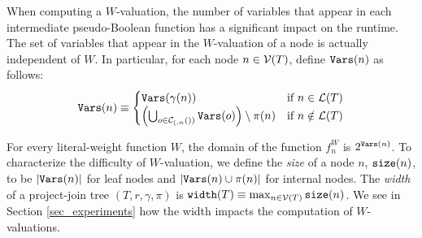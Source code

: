 When computing a $W$-valuation, the number of variables that appear in each intermediate pseudo-Boolean function has a significant impact on the runtime.
The set of variables that appear in the $W$-valuation of a node is actually independent of $W$.
In particular, for each node $n \in \mathcal{V}(T)$, define $\texttt{\upshape Vars}(n)$ as follows:
\begin{equation}
    \texttt{\upshape Vars}(n) \equiv
    \begin{cases}
        \texttt{\upshape Vars}(\gamma(n)) & \text{if}~n \in \mathcal{L}(T) \\
        \left( \bigcup_{o \in \mathcal{C}_{(,n}())} \texttt{\upshape Vars}(o) \right) \setminus \pi(n) & \text{if}~n \notin \mathcal{L}(T)
    \end{cases}
\end{equation}

For every literal-weight function $W$, the domain of the function $f^W_n$ is $2^{\texttt{\upshape Vars}(n)}$.
To characterize the difficulty of $W$-valuation, we define the \emph{size} of a node $n$, $\texttt{\upshape size}(n)$, to be $\left| \texttt{\upshape Vars}(n) \right|$ for leaf nodes and $\left| \texttt{\upshape Vars}(n) \cup \pi(n) \right|$ for internal nodes.
The \emph{width} of a project-join tree $(T, r, \gamma, \pi)$ is $\texttt{\upshape width}(T) \equiv \max_{n \in \mathcal{V}(T)} \texttt{\upshape size}(n)$.
We see in Section \ref{sec_experiments} how the width impacts the computation of $W$-valuations.





